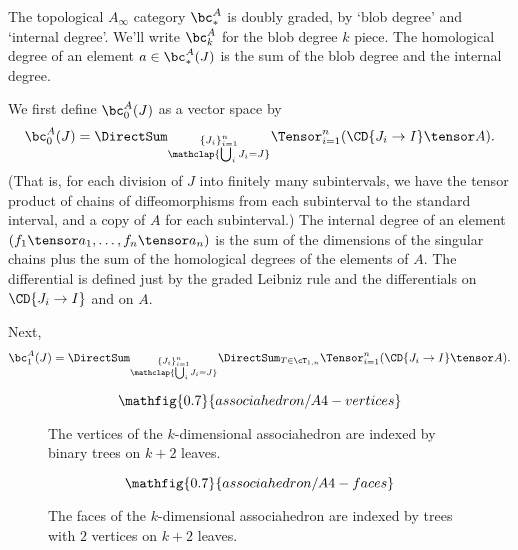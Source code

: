 \begin{defn}
The topological $A_\infty$ category $\bc_*^A$ is doubly graded, by `blob degree' and `internal degree'. We'll write $\bc_k^A$ for the blob degree $k$ piece.
The homological degree of an element $a \in \bc_*^A(J)$
is the sum of the blob degree and the internal degree.

We first define $\bc_0^A(J)$ as a vector space by
\begin{equation*}
\bc_0^A(J) = \DirectSum_{\substack{\{J_i\}_{i=1}^n \\ \mathclap{\bigcup_i J_i = J}}} \Tensor_{i=1}^n (\CD{J_i \to I} \tensor A).
\end{equation*}
(That is, for each division of $J$ into finitely many subintervals,
we have the tensor product of chains of diffeomorphisms from each subinterval to the standard interval,
and a copy of $A$ for each subinterval.)
The internal degree of an element $(f_1 \tensor a_1, \ldots, f_n \tensor a_n)$ is the sum of the dimensions of the singular chains
plus the sum of the homological degrees of the elements of $A$.
The differential is defined just by the graded Leibniz rule and the differentials on $\CD{J_i \to I}$ and on $A$.

Next,
\begin{equation*}
\bc_1^A(J) = \DirectSum_{\substack{\{J_i\}_{i=1}^n \\ \mathclap{\bigcup_i J_i = J}}} \DirectSum_{T \in \cT_{1,n}} \Tensor_{i=1}^n (\CD{J_i \to I} \tensor A).
\end{equation*}
\end{defn}

\begin{figure}[!ht]
\begin{equation*}
\mathfig{0.7}{associahedron/A4-vertices}
\end{equation*}
\caption{The vertices of the $k$-dimensional associahedron are indexed by binary trees on $k+2$ leaves.}
\label{fig:A4-vertices}
\end{figure}

\begin{figure}[!ht]
\begin{equation*}
\mathfig{0.7}{associahedron/A4-faces}
\end{equation*}
\caption{The faces of the $k$-dimensional associahedron are indexed by trees with $2$ vertices on $k+2$ leaves.}
\label{fig:A4-vertices}
\end{figure}

\newcommand{\tm}{\widetilde{m}}

